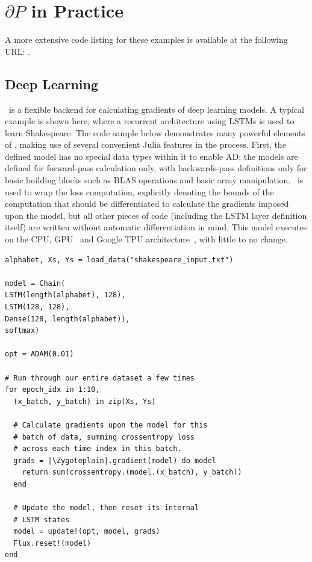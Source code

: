 \documentclass{juliacon}
\newcommand{\Zygote}{\iftoggle{anonymous}{$\partial$P.jl}{Zygote}}
\newcommand{\Zygoteplain}{\iftoggle{anonymous}{$\partial$P.jl}{Zygote}}
\begin{document}
\section{$\partial P$ in Practice}

A more extensive code listing for these examples is available at the following URL: \iftoggle{anonymous}{Hidden for review - an anonymized version is included as supplemental material}{https://github.com/MikeInnes/zygote-paper}.

\subsection{Deep Learning}
\label{dl}

\Zygote\ is a flexible backend for calculating gradients of deep learning models. A typical example is shown here, where a recurrent architecture using LSTMs \cite{Hochreiter:1997:lstm} is used to learn Shakespeare.
The code sample below demonstrates many powerful elements of \Zygote, making use of several convenient Julia features in the process.  First, the defined model has no special data types within it to enable AD; the models are defined for forward-pass calculation only, with backwards-pass definitions only for basic building blocks such as BLAS operations and basic array manipulation. \Zygote\ is used to wrap the loss computation, explicitly denoting the bounds of the computation that should be differentiated to calculate the gradients imposed upon the model, but all other pieces of code (including the LSTM layer definition itself) are written without automatic differentiation in mind. This model executes on the CPU, GPU~\cite{Flux.jl-2018} and Google TPU architecture~\cite{XLA.jl-2018}, with little to no change.

\begin{verbatim}
alphabet, Xs, Ys = load_data("shakespeare_input.txt")

model = Chain(
LSTM(length(alphabet), 128),
LSTM(128, 128),
Dense(128, length(alphabet)),
softmax)

opt = ADAM(0.01)

# Run through our entire dataset a few times
for epoch_idx in 1:10,
  (x_batch, y_batch) in zip(Xs, Ys)
  
  # Calculate gradients upon the model for this
  # batch of data, summing crossentropy loss
  # across each time index in this batch.
  grads = |\Zygoteplain|.gradient(model) do model
    return sum(crossentropy.(model.(x_batch), y_batch))
  end
  
  # Update the model, then reset its internal
  # LSTM states
  model = update!(opt, model, grads)
  Flux.reset!(model)
end
\end{verbatim}
\end{document}
